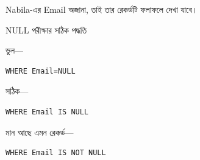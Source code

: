 Nabila-এর Email অজানা, তাই তার রেকর্ডটি ফলাফলে দেখা যাবে।

\begin{mistakebox}{NULL পরীক্ষার সঠিক পদ্ধতি}

ভুল—

\par\noindent\begin{minipage}{\linewidth}
\begin{verbatim}
WHERE Email=NULL
\end{verbatim}
\end{minipage}\par

সঠিক—

\par\noindent\begin{minipage}{\linewidth}
\begin{verbatim}
WHERE Email IS NULL
\end{verbatim}
\end{minipage}\par

\end{mistakebox}

মান আছে এমন রেকর্ড—

\par\noindent\begin{minipage}{\linewidth}
\begin{verbatim}
WHERE Email IS NOT NULL
\end{verbatim}
\end{minipage}\par

